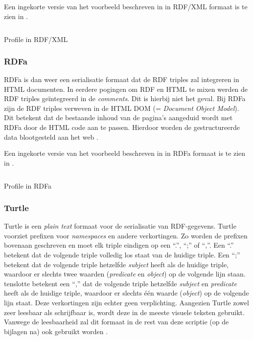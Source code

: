 Een ingekorte versie van het voorbeeld beschreven in  in RDF/XML formaat is te zien in .

\begin{listing}[ht]
    \inputminted{xml}{data/profile_short.rdf}
    \caption{Profile in RDF/XML}
    \label{listing:profile_xml}
\end{listing}


\subsubsection{RDFa}
RDFa is dan weer een serialisatie formaat dat de RDF triples zal integreren in HTML documenten. In eerdere pogingen om RDF en HTML te mixen werden de RDF triples geïntegreerd in de \textit{comments}. Dit is hierbij niet het geval. Bij RDFa zijn de RDF triples verweven in de HTML DOM (= \textit{Document Object Model}). Dit betekent dat de bestaande inhoud van de pagina's aangeduid wordt met RDFa door de HTML code aan te passen. Hierdoor worden de gestructureerde data blootgesteld aan het web \cite{adida2012rdfa}.

Een ingekorte versie van het voorbeeld beschreven in  in RDFa formaat is te zien in .

\begin{listing}[ht]
    \inputminted{html}{data/profile_short.html}
    \caption{Profile in RDFa}
    \label{listing:profile_rdfa}
\end{listing}


\subsubsection{Turtle}
Turtle is een \textit{plain text} formaat voor de serialisatie van RDF-gegevens. Turtle voorziet prefixen voor \textit{namespaces} en andere verkortingen. Zo worden de prefixen bovenaan geschreven en moet elk triple eindigen op een ``.'', ``;'' of ``,''. Een ``.'' betekent dat de volgende triple volledig los staat van de huidige triple. Een ``;'' betekent dat de volgende triple hetzelfde \textit{subject} heeft als de huidige triple, waardoor er slechts twee waarden (\textit{predicate} en \textit{object}) op de volgende lijn staan. tenslotte betekent een ``,'' dat de volgende triple hetzelfde \textit{subject} en \textit{predicate} heeft als de huidige triple, waardoor er slechts één waarde (\textit{object}) op de volgende lijn staat. Deze verkortingen zijn echter geen verplichting. Aangezien Turtle zowel zeer leesbaar als schrijfbaar is, wordt deze in de meeste visuele teksten gebruikt. Vanwege de leesbaarheid zal dit formaat in de rest van deze scriptie (op de bijlagen na) ook gebruikt worden  \cite{beckett2014rdfturtle}.

